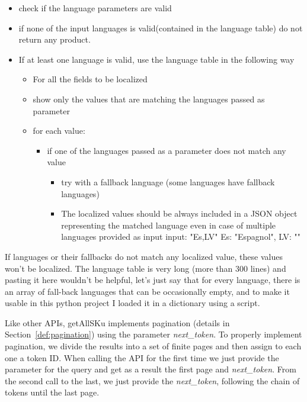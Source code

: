 \begin{itemize}
    \item check if the language parameters are valid
    
    \item if none of the input languages is valid(contained in the language table) do not return any product.

    \item If at least one language is valid, use the language table in the following way
    \begin{itemize}
        \item For all the fields to be localized 
        \item show only the values that are matching the languages passed
    as parameter
    \item for each value:
        \begin{itemize}
            \item if one of the languages passed as a parameter does not
            match any value
            \begin{itemize}
                \item try with a fallback language (some languages have
                        fallback languages)
                \item The localized values should be always included in a
                JSON object representing the matched language even
                in case of multiple languages provided as input
                input: "Es,LV" Es: "Espagnol", LV: ""


                
            \end{itemize}
        \end{itemize}
    \end{itemize}
\end{itemize}

If languages or their fallbacks do not match any localized value, these values won't be localized.
The language table is very long (more than 300 lines) and pasting it here wouldn't be helpful, let's just say that
for every language, there is an array of fall-back languages that can be occasionally empty, and to
make it usable in this python project I loaded it in a dictionary using a script.

Like other APIs, getAllSKu implements pagination (details in Section~\ref{def:pagination}) using the parameter \textit{next\_token}.
To properly implement pagination, we divide the results into a set of finite pages and then assign to each one a 
token ID. When calling the API for the first time we just provide the parameter for the query and get as a result
the first page and \textit{next\_token}. From the second call to the last, we just provide the \textit{next\_token}, following the
chain of tokens until the last page.

